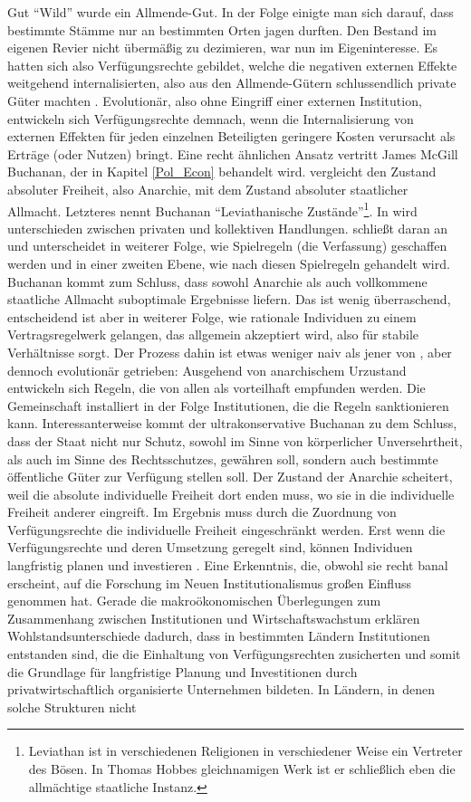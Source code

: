 Gut "`Wild"' wurde ein Allmende-Gut. In der Folge einigte man sich darauf, dass bestimmte Stämme nur an bestimmten Orten jagen durften. Den Bestand im eigenen Revier nicht übermäßig zu dezimieren, war nun im Eigeninteresse. Es hatten sich also Verfügungsrechte gebildet, welche die negativen externen Effekte weitgehend internalisierten, also aus den Allmende-Gütern schlussendlich private Güter machten \parencite{Demsetz1967}. Evolutionär, also ohne Eingriff einer externen Institution, entwickeln sich Verfügungsrechte demnach, wenn die Internalisierung von externen Effekten für jeden einzelnen Beteiligten geringere Kosten verursacht als Erträge (oder Nutzen) bringt. Eine recht ähnlichen Ansatz vertritt James McGill Buchanan, der in Kapitel \ref{Pol_Econ} behandelt wird. \textcite{Buchanan1975} vergleicht den Zustand absoluter Freiheit, also Anarchie, mit dem Zustand absoluter staatlicher Allmacht. Letzteres nennt Buchanan "`Leviathanische Zustände"'\footnote{Leviathan ist in verschiedenen Religionen in verschiedener Weise ein Vertreter des Bösen. In Thomas Hobbes gleichnamigen Werk ist er schließlich eben die allmächtige staatliche Instanz.}. In \textcite{Hobbes1651} wird unterschieden zwischen privaten und kollektiven Handlungen. \textcite{Buchanan1975} schließt daran an und unterscheidet in weiterer Folge, wie Spielregeln (die Verfassung) geschaffen werden und in einer zweiten Ebene, wie nach diesen Spielregeln gehandelt wird. Buchanan kommt zum Schluss, dass sowohl Anarchie als auch vollkommene staatliche Allmacht suboptimale Ergebnisse liefern. Das ist wenig überraschend, entscheidend ist aber in weiterer Folge, wie rationale Individuen zu einem Vertragsregelwerk gelangen, das allgemein akzeptiert wird, also für stabile Verhältnisse sorgt. Der Prozess dahin ist etwas weniger naiv als jener von \textcite{Demsetz1967}, aber dennoch evolutionär getrieben: Ausgehend von anarchischem Urzustand entwickeln sich Regeln, die von allen als vorteilhaft empfunden werden. Die Gemeinschaft installiert in der Folge Institutionen, die die Regeln sanktionieren kann. Interessanterweise kommt der ultrakonservative Buchanan zu dem Schluss, dass der Staat nicht nur Schutz, sowohl im Sinne von körperlicher Unversehrtheit, als auch im Sinne des Rechtsschutzes, gewähren soll, sondern auch bestimmte öffentliche Güter zur Verfügung stellen soll. Der Zustand der Anarchie scheitert, weil die absolute individuelle Freiheit dort enden muss, wo sie in die individuelle Freiheit anderer eingreift. Im Ergebnis muss durch die Zuordnung von Verfügungsrechte die individuelle Freiheit eingeschränkt werden. Erst wenn die Verfügungsrechte und deren Umsetzung geregelt sind, können Individuen langfristig planen und investieren \parencite[S. 285]{Erlei2016}. Eine Erkenntnis, die, obwohl sie recht banal erscheint, auf die Forschung im Neuen Institutionalismus großen Einfluss genommen hat. Gerade die makroökonomischen Überlegungen zum Zusammenhang zwischen Institutionen und Wirtschaftswachstum erklären Wohlstandsunterschiede dadurch, dass in bestimmten Ländern Institutionen entstanden sind, die die Einhaltung von Verfügungsrechten zusicherten und somit die Grundlage für langfristige Planung und Investitionen durch privatwirtschaftlich organisierte Unternehmen bildeten. In Ländern, in denen solche Strukturen nicht 